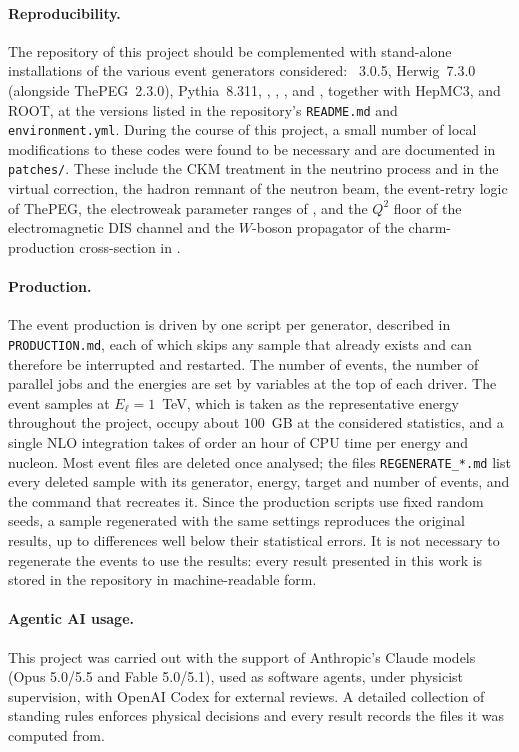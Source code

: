 \paragraph{Reproducibility.} 
%
The repository of this project should be complemented with stand-alone installations of the various event generators considered:  \sherpa~3.0.5, {\sc\small Herwig}~7.3.0 (alongside ThePEG~2.3.0), {\sc\small Pythia}~8.311, \powhegres, \powhegtwo, \genie, and \yadism, together with HepMC3, \lhapdf and ROOT, at the versions listed in the repository's \texttt{README.md} and \texttt{environment.yml}.
%
During the course of this project, a small number of local modifications to these codes were found to be necessary and are documented in \texttt{patches/}.
%
These include the CKM treatment in the \powhegtwo neutrino
process and in the \sherpa virtual correction, the hadron remnant of the \sherpa neutron beam, the event-retry logic of ThePEG, the electroweak parameter ranges of \pythia, and the $Q^2$ floor of the electromagnetic DIS channel and the $W$-boson propagator of the charm-production cross-section in \genie.  

\paragraph{Production.} 
%
The event production is driven by one script per generator, described in \texttt{PRODUCTION.md}, each of which skips any sample that already exists and can therefore be interrupted and restarted.  The number of events, the number of parallel jobs and the energies are set by variables at the top of each driver.  
%
The event samples at $E_\ell=1$~TeV, which is taken as the representative energy throughout the project, occupy about $100$~GB at the considered statistics, and a single NLO integration takes of order an hour of CPU time per energy and nucleon.  
%
Most event files are deleted once analysed; the files
\texttt{REGENERATE\_*.md} list every deleted sample with its generator, energy, target and number of events, and the command that recreates it. 
%
Since the production scripts use fixed random seeds, a sample regenerated with the same settings reproduces the original results, up to differences well below their statistical errors. 
%
It is not necessary to regenerate the events to use the
results: every result presented in this work is stored in the repository in machine-readable form.

\paragraph{Agentic AI usage.}  This project was carried out with the support of Anthropic's Claude models (Opus 5.0/5.5 and Fable 5.0/5.1), used as software agents, under physicist supervision, with OpenAI Codex for external reviews.
%
A detailed collection of standing rules enforces physical decisions and every result records the files it was computed from.  